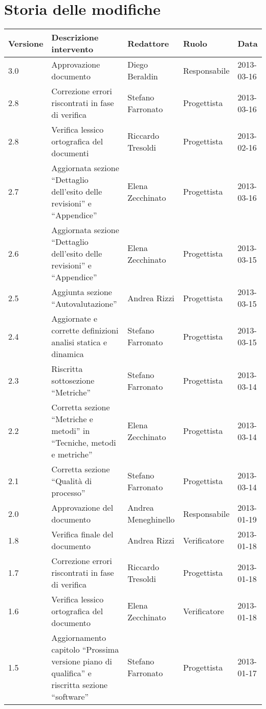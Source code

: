 \section*{Storia delle modifiche}
\begin{longtable}{lp{}lll}
\toprule
Versione & Descrizione intervento & Redattore & Ruolo & Data\\
\midrule %

3.0 & Approvazione documento& Diego Beraldin &Responsabile & 2013-03-16\\
2.8 & Correzione errori riscontrati in fase di verifica& Stefano Farronato &Progettista & 2013-03-16\\
2.8 & Verifica lessico ortografica del documenti& Riccardo Tresoldi &Progettista & 2013-02-16\\
2.7 & Aggiornata sezione ``Dettaglio dell'esito delle revisioni'' e ``Appendice'' & Elena Zecchinato &Progettista & 2013-03-16\\
2.6 & Aggiornata sezione ``Dettaglio dell'esito delle revisioni'' e ``Appendice'' & Elena Zecchinato &Progettista & 2013-03-15\\
2.5 & Aggiunta sezione ``Autovalutazione'' & Andrea Rizzi &Progettista & 2013-03-15\\
2.4 & Aggiornate e corrette definizioni analisi statica e dinamica & Stefano Farronato &Progettista  & 2013-03-15\\
2.3 & Riscritta sottosezione ``Metriche''  & Stefano Farronato &Progettista  & 2013-03-14\\
2.2 & Corretta sezione ``Metriche e metodi'' in ``Tecniche, metodi e metriche'' & Elena Zecchinato &Progettista & 2013-03-14\\
2.1 & Corretta sezione ``Qualità di processo'' & Stefano Farronato &Progettista & 2013-03-14\\
2.0 & Approvazione del documento& Andrea Meneghinello &Responsabile & 2013-01-19\\
1.8 & Verifica finale del documento& Andrea Rizzi &Verificatore & 2013-01-18\\
1.7 & Correzione errori riscontrati in fase di verifica& Riccardo Tresoldi &Progettista & 2013-01-18\\
1.6 & Verifica lessico ortografica del documento& Elena Zecchinato &Verificatore & 2013-01-18\\
1.5 & Aggiornamento capitolo ``Prossima versione piano di qualifica'' e riscritta sezione ``software''& Stefano Farronato &Progettista & 2013-01-17\\

\end{longtable}
